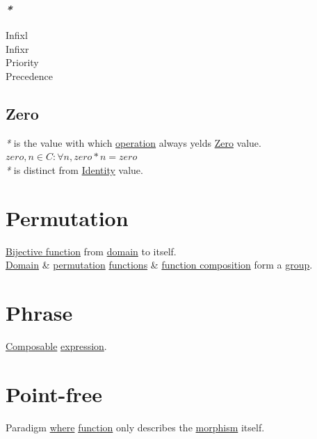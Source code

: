 \documentclass[a4paper,14pt,oneside]{book}
\begin{document}
\subsection{\emph{*}}
\label{sec:orgf0449c7}

\label{orgac5b19d}Infixl\\
\label{orgbbed474}Infixr\\
\label{org450eb96}Priority\\
\label{orgd2e0934}Precedence\\

\section{\label{org6c52cc9}Zero}
\label{sec:orge02d5bd}
\emph{*} is the value with which \hyperref[org53f0458]{operation} always yelds \hyperref[org6c52cc9]{Zero} value.\\
\(zero, n \in C : \forall n, zero*n=zero\)\\

\emph{*} is distinct from \hyperref[org79eeec1]{Identity} value.\\

\chapter{\label{orgbd39ca5}Permutation}
\label{sec:orgcdf6a84}
\hyperref[orgdb5d819]{Bijective function} from \hyperref[org2ec54f8]{domain} to itself.\\

\hyperref[org2ec54f8]{Domain} \& \hyperref[orgbd39ca5]{permutation} \hyperref[orgcfd72f2]{functions} \& \hyperref[org9aa90f2]{function composition} form a \hyperref[org5f7db57]{group}.\\

\chapter{\label{org01aa78a}Phrase}
\label{sec:orgd5566e9}
\hyperref[org7b9fb42]{Composable} \hyperref[org4eaaefd]{expression}.\\

\chapter{\label{orga6e657c}Point-free}
\label{sec:org856f969}
Paradigm \hyperref[org002404a]{where} \hyperref[org39271b2]{function} only describes the \hyperref[orga7d420f]{morphism} itself.\\
\end{document}
